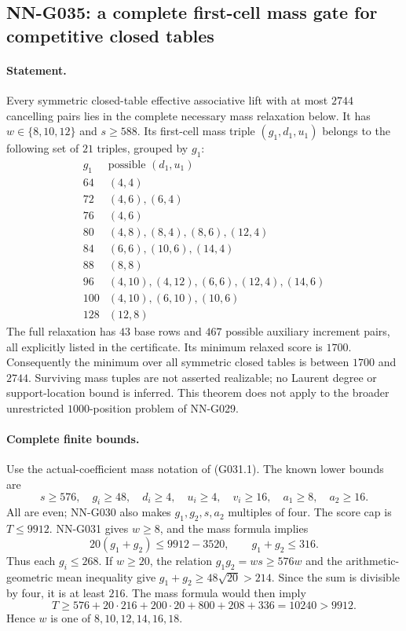 \subsection{NN-G035: a complete first-cell mass gate for competitive closed tables}
\paragraph{Statement.}
Every symmetric closed-table effective associative lift with
at most $2744$ cancelling pairs lies in the complete necessary
mass relaxation below. It has $w\in\{8,10,12\}$ and $s\ge588$.
Its first-cell mass triple $(g_1,d_1,u_1)$ belongs to the
following set of $21$ triples, grouped by $g_1$:
\[
\begin{array}{c|l}
 g_1&\text{possible }(d_1,u_1)\\\hline
 64&(4,4)\\
 72&(4,6),(6,4)\\
 76&(4,6)\\
 80&(4,8),(8,4),(8,6),(12,4)\\
 84&(6,6),(10,6),(14,4)\\
 88&(8,8)\\
 96&(4,10),(4,12),(6,6),(12,4),(14,6)\\
 100&(4,10),(6,10),(10,6)\\
 128&(12,8)
\end{array}                                                         \tag{G035.1}
\]
The full relaxation has $43$ base rows and $467$ possible
auxiliary increment pairs, all explicitly listed in the
certificate. Its minimum relaxed score is $1700$.
Consequently the minimum over all symmetric closed tables
is between $1700$ and $2744$.
Surviving mass tuples are not asserted realizable; no
Laurent degree or support-location bound is inferred.
This theorem does not apply to the broader unrestricted
$1000$-position problem of NN-G029.

\paragraph{Complete finite bounds.}
Use the actual-coefficient mass notation of (G031.1).
The known lower bounds are
\[
 s\ge576,\quad g_i\ge48,\quad d_i\ge4,\quad
 u_i\ge4,\quad v_i\ge16,\quad a_1\ge8,\quad a_2\ge16.
\]
All are even; NN-G030 also makes $g_1,g_2,s,a_2$
multiples of four. The score cap is $T\le9912$.
NN-G031 gives $w\ge8$, and the mass formula implies
\[
              20(g_1+g_2)\le9912-3520,
              \qquad g_1+g_2\le316.                 \tag{G035.2}
\]
Thus each $g_i\le268$.
If $w\ge20$, the relation $g_1g_2=ws\ge576w$
and the arithmetic-geometric mean inequality give
$g_1+g_2\ge48\sqrt{20}>214$.
Since the sum is divisible by four, it is at least
$216$. The mass formula would then imply
\[
 T\ge576+20\cdot216+200\cdot20+800+208+336
       =10240>9912.
\]
Hence $w$ is one of $8,10,12,14,16,18$.

